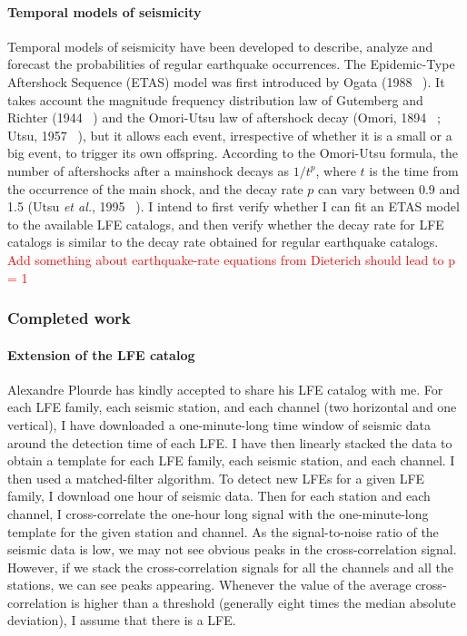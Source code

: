 \documentclass[letterpaper, 12pt]{article}
\begin{document}
\paragraph{Temporal models of seismicity} Temporal models of seismicity have been developed to describe, analyze and forecast the probabilities of regular earthquake occurrences. The Epidemic-Type Aftershock Sequence (ETAS) model was first introduced by Ogata (1988 ~\cite{OGA_1988}). It takes account the magnitude frequency distribution law of Gutemberg and Richter (1944 ~\cite{GUT_1944}) and the Omori-Utsu law of aftershock decay (Omori, 1894 ~\cite{OMO_1894}; Utsu, 1957 ~\cite{UTS_1957}), but it allows each event, irrespective of whether it is a small or a big event, to trigger its own offspring. According to the Omori-Utsu formula, the number of aftershocks after a mainshock decays as $1 / t^p$, where $t$ is the time from the occurrence of the main shock, and the decay rate $p$ can vary between 0.9 and 1.5 (Utsu \textit{et al.}, 1995 ~\cite{UTS_1995}). I intend to first verify whether I can fit an ETAS model to the available LFE catalogs, and then verify whether the decay rate for LFE catalogs is similar to the decay rate obtained for regular earthquake catalogs. \\

\textcolor{red}{Add something about earthquake-rate equations from Dieterich should lead to p = 1}

\subsubsection*{Completed work}

\paragraph{Extension of the LFE catalog} Alexandre Plourde has kindly accepted to share his LFE catalog with me. For each LFE family, each seismic station, and each channel (two horizontal and one vertical), I have downloaded a one-minute-long time window of seismic data around the detection time of each LFE. I have then linearly stacked the data to obtain a template for each LFE family, each seismic station, and each channel. I then used a matched-filter algorithm. To detect new LFEs for a given LFE family, I download one hour of seismic data. Then for each station and each channel, I cross-correlate the one-hour long signal with the one-minute-long template for the given station and channel. As the signal-to-noise ratio of the seismic data is low, we may not see obvious peaks in the cross-correlation signal. However, if we stack the cross-correlation signals for all the channels and all the stations, we can see peaks appearing. Whenever the value of the average cross-correlation is higher than a threshold (generally eight times the median absolute deviation), I assume that there is a LFE. \\
\end{document}
